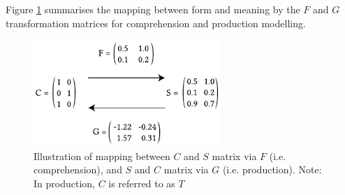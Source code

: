 Figure \ref{fig:3_1} summarises the mapping between form and meaning by the $F$ and $G$ transformation matrices for comprehension and production modelling.

\begin{figure}
    \centering
    \includegraphics[width=200pt]{figures/fig3.1.pdf}
    \caption{Illustration of mapping between $C$ and $S$ matrix via $F$ (i.e. comprehension), and $S$ and $C$ matrix via $G$ (i.e. production). Note: In production, $C$ is referred to as $T$}
    \label{fig:3_1}
\end{figure}
